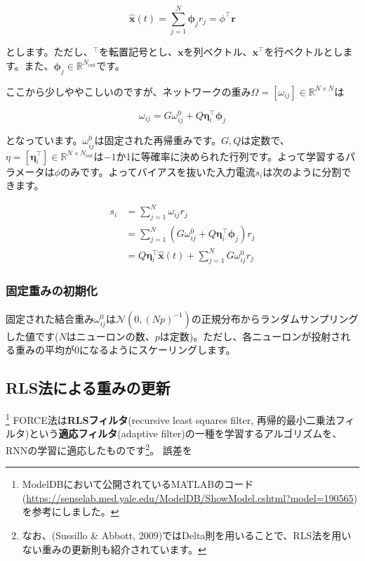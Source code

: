 \begin{equation}
\hat{\boldsymbol{x}}(t)=\sum_{j=1}^{N} \boldsymbol{\phi}_j r_{j}=\phi^\intercal\boldsymbol{r}
\end{equation}


とします。ただし、$^\intercal$を転置記号とし、$\boldsymbol{x}$を列ベクトル、$\boldsymbol{x}^\intercal$を行ベクトルとします。また、$\boldsymbol{\phi}_j\in \mathbb{R}^{N_\text{out}}$です。\par
ここから少しややこしいのですが、ネットワークの重み$\Omega=[\omega_{ij}]\in \mathbb{R}^{N\times N}$は 


\begin{equation}
\omega_{i j}=G \omega_{i j}^{0}+Q \boldsymbol{\eta}_{i}^\intercal \boldsymbol{\phi}_j 
\end{equation}


となっています。$\omega_{i j}^{0}$は固定された再帰重みです。$G, Q$は定数で、$\eta=[\boldsymbol{\eta}_{i}^\intercal]\in \mathbb{R}^{N\times N_\text{out}}$は$-1$か1に等確率に決められた行列です。よって学習するパラメータは$\phi$のみです。よってバイアスを抜いた入力電流$s_{i}$は次のように分割できます。


\begin{align}
s_{i}&=\sum_{j=1}^{N} \omega_{i j} r_{j}\\
&=\sum_{j=1}^{N} \left(G \omega_{i j}^{0}+Q \boldsymbol{\eta}_{i}^\intercal \boldsymbol{\phi}_j \right)r_{j}\\
&=Q\boldsymbol{\eta}_{i}^\intercal \hat{\boldsymbol{x}}(t)+\sum_{j=1}^{N} G \omega_{i j}^{0}r_{j}
\end{align}


\subsubsection{固定重みの初期化}
固定された結合重み$\omega_{i j}^{0}$は$\mathcal{N}(0, (Np)^{-1})$の正規分布からランダムサンプリングした値です($N$はニューロンの数、$p$は定数)。ただし、各ニューロンが投射される重みの平均が0になるようにスケーリングします。
\subsection{RLS法による重みの更新}
\footnote{ModelDBにおいて公開されているMATLABのコード(\url{https://senselab.med.yale.edu/ModelDB/ShowModel.cshtml?model=190565})を参考にしました。}
FORCE法は\textbf{RLSフィルタ}(recursive least squares filter, 再帰的最小二乗法フィルタ)という\textbf{適応フィルタ}(adaptive filter)の一種を学習するアルゴリズムを、RNNの学習に適応したものです\footnote{なお、(Sussillo \& Abbott, 2009)ではDelta則を用いることで、RLS法を用いない重みの更新則も紹介されています。}。
誤差を 


